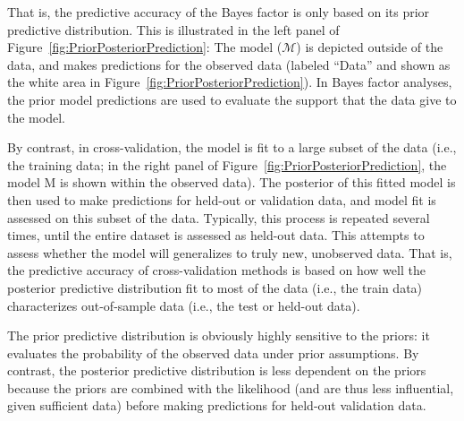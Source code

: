 \documentclass[12pt,]{krantz}
\theoremstyle{definition}
\theoremstyle{definition}
\theoremstyle{definition}
\theoremstyle{remark}
\begin{document}
That is, the predictive accuracy of the Bayes factor is only based on its prior predictive distribution. This is illustrated in the left panel of Figure~\ref{fig:PriorPosteriorPrediction}: The model (\(\mathcal{M}\)) is depicted outside of the data, and makes predictions for the observed data (labeled ``Data'' and shown as the white area in Figure~\ref{fig:PriorPosteriorPrediction}). In Bayes factor analyses, the prior model predictions are used to evaluate the support that the data give to the model.

By contrast, in cross-validation, the model is fit to a large subset of the data (i.e., the training data; in the right panel of Figure~\ref{fig:PriorPosteriorPrediction}, the model M is shown within the observed data). The posterior of this fitted model is then used to make predictions for held-out or validation data, and model fit is assessed on this subset of the data. Typically, this process is repeated several times, until the entire dataset is assessed as held-out data. This attempts to assess whether the model will generalizes to truly new, unobserved data. That is, the predictive accuracy of cross-validation methods is based on how well the posterior predictive distribution fit to most of the data (i.e., the train data) characterizes out-of-sample data (i.e., the test or held-out data).

The prior predictive distribution is obviously highly sensitive to the priors: it evaluates the probability of the observed data under prior assumptions. By contrast, the posterior predictive distribution is less dependent on the priors because the priors are combined with the likelihood (and are thus less influential, given sufficient data) before making predictions for held-out validation data.
\end{document}
